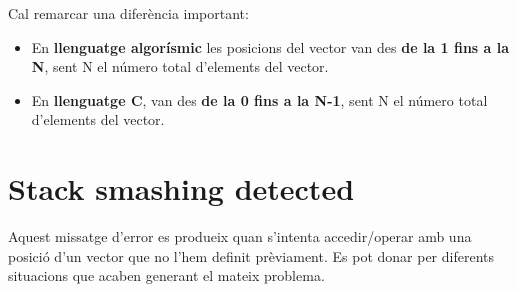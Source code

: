 \documentclass[]{book}
\newenvironment{Shaded}{\begin{snugshade}}{\end{snugshade}}
\newcommand{\DataTypeTok}[1]{\textcolor[rgb]{0.13,0.29,0.53}{#1}}
\newcommand{\DecValTok}[1]{\textcolor[rgb]{0.00,0.00,0.81}{#1}}
\newcommand{\SpecialCharTok}[1]{\textcolor[rgb]{0.00,0.00,0.00}{#1}}
\newcommand{\StringTok}[1]{\textcolor[rgb]{0.31,0.60,0.02}{#1}}
\newcommand{\ImportTok}[1]{#1}
\newcommand{\ControlFlowTok}[1]{\textcolor[rgb]{0.13,0.29,0.53}{\textbf{#1}}}
\newcommand{\PreprocessorTok}[1]{\textcolor[rgb]{0.56,0.35,0.01}{\textit{#1}}}
\newcommand{\NormalTok}[1]{#1}
\providecommand{\tightlist}{%
  \setlength{\itemsep}{0pt}\setlength{\parskip}{0pt}}
\begin{document}
\begin{Shaded}
\end{Shaded}

Cal remarcar una diferència important:

\begin{itemize}
\tightlist
\item
  En \textbf{llenguatge algorísmic} les posicions del vector van des
  \textbf{de la 1 fins a la N}, sent N el número total d'elements del
  vector.
\item
  En \textbf{llenguatge C}, van des \textbf{de la 0 fins a la N-1}, sent
  N el número total d'elements del vector.
\end{itemize}

\section{Stack smashing detected}\label{stack-smashing-detected}

Aquest missatge d'error es produeix quan s'intenta accedir/operar amb
una posició d'un vector que no l'hem definit prèviament. Es pot donar
per diferents situacions que acaben generant el mateix problema.
\end{document}
